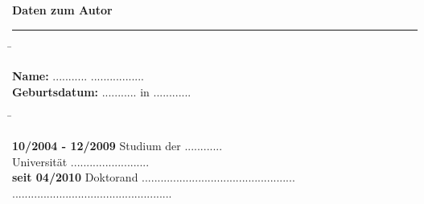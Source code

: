 \begin{flushleft}{\bf Daten zum Autor} \\\rule{120mm}{0.5mm}\end{flushleft}

\begin{tabbing} \hspace*{4.5cm}\=\kill 

\textbf{Name:} \> ........... .................\\
\textbf{Geburtsdatum:} \> ........... in ............ \\

\end{tabbing}

\vspace{-1cm}

\begin{tabbing} \hspace*{4.5cm}\=\kill 

\textbf{10/2004 - 12/2009} \> Studium der ............\\
\> Universit\"at ......................... \\
\textbf{seit 04/2010} \> Doktorand .................................................\\
\> ...................................................\\ 

\end{tabbing}
